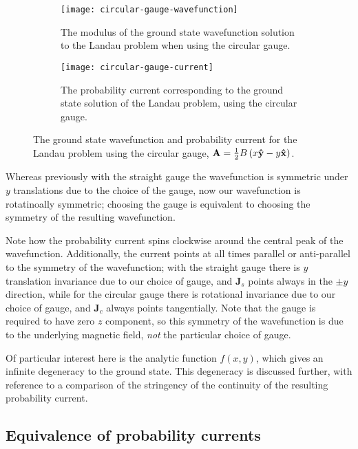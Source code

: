 \begin{figure}
    \centering
    \begin{subfigure}{0.45\linewidth}
        \centering
        \texttt{[image: circular-gauge-wavefunction]}
        \caption{The modulus of the ground state wavefunction solution to the
            Landau problem when using the circular gauge.}
        \label{subfig:circular-wavefunction}
    \end{subfigure}
    \begin{subfigure}{0.45\linewidth}
        \centering
        \texttt{[image: circular-gauge-current]}
        \caption{The probability current corresponding to the ground state solution
            of the Landau problem, using the circular gauge.}
        \label{subfig:circular-current}
    \end{subfigure}
    \caption{The ground state wavefunction and probability current for the
        Landau problem using the circular gauge, $\mathbf{A} = \frac{1}{2} B
        \left( x\mathbf{\hat y } - y\mathbf{\hat x } \right)$.}
    \label{fig:circular}
\end{figure}

Whereas previously with the straight gauge the wavefunction is symmetric under
$y$ translations due to the choice of the gauge, now our wavefunction is
rotatinoally symmetric; choosing the gauge is equivalent to choosing the
symmetry of the resulting wavefunction.

Note how the probability current spins clockwise around the central peak of the
wavefunction. Additionally, the current points at all times parallel or
anti-parallel to the symmetry of the wavefunction; with the straight gauge there
is $y$ translation invariance due to our choice of gauge, and $\mathbf{J}_s$ points always in the $\pm y$
direction, while for the circular gauge there is rotational invariance due to
our choice of gauge, and
$\mathbf{J}_c$ always points tangentially. Note that the gauge is required to
have zero $z$ component, so this symmetry of the wavefunction is due to the
underlying magnetic field, \textit{not} the particular choice of gauge.

Of particular interest here is the analytic function $f(x,y)$, which gives an
infinite degeneracy to the ground state. This degeneracy is discussed further,
with reference to a comparison of the stringency of the continuity of the
resulting probability current.

\subsection{Equivalence of probability currents}

